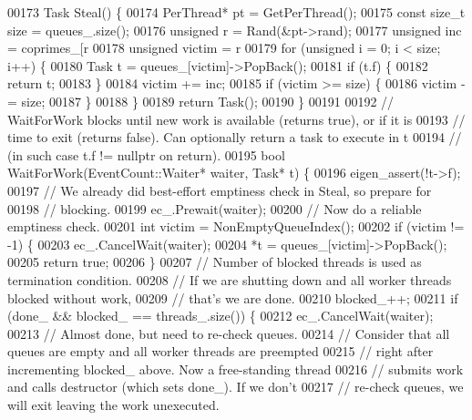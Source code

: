 \begin{DoxyCode}
{00173   Task Steal() \{
00174     PerThread* pt = GetPerThread();
00175     \textcolor{keyword}{const} \textcolor{keywordtype}{size\_t} size = queues\_.size();
00176     \textcolor{keywordtype}{unsigned} r = Rand(&pt->rand);
00177     \textcolor{keywordtype}{unsigned} inc = coprimes\_[r %
00178     \textcolor{keywordtype}{unsigned} victim = r %
00179     \textcolor{keywordflow}{for} (\textcolor{keywordtype}{unsigned} i = 0; i < size; i++) \{
00180       Task t = queues\_[victim]->PopBack();
00181       \textcolor{keywordflow}{if} (t.f) \{
00182         \textcolor{keywordflow}{return} t;
00183       \}
00184       victim += inc;
00185       \textcolor{keywordflow}{if} (victim >= size) \{
00186         victim -= size;
00187       \}
00188     \}
00189     \textcolor{keywordflow}{return} Task();
00190   \}
00191 
00192   \textcolor{comment}{// WaitForWork blocks until new work is available (returns true), or if it is}
00193   \textcolor{comment}{// time to exit (returns false). Can optionally return a task to execute in t}
00194   \textcolor{comment}{// (in such case t.f != nullptr on return).}
00195   \textcolor{keywordtype}{bool} WaitForWork(EventCount::Waiter* waiter, Task* t) \{
00196     eigen\_assert(!t->f);
00197     \textcolor{comment}{// We already did best-effort emptiness check in Steal, so prepare for}
00198     \textcolor{comment}{// blocking.}
00199     ec\_.Prewait(waiter);
00200     \textcolor{comment}{// Now do a reliable emptiness check.}
00201     \textcolor{keywordtype}{int} victim = NonEmptyQueueIndex();
00202     \textcolor{keywordflow}{if} (victim != -1) \{
00203       ec\_.CancelWait(waiter);
00204       *t = queues\_[victim]->PopBack();
00205       \textcolor{keywordflow}{return} \textcolor{keyword}{true};
00206     \}
00207     \textcolor{comment}{// Number of blocked threads is used as termination condition.}
00208     \textcolor{comment}{// If we are shutting down and all worker threads blocked without work,}
00209     \textcolor{comment}{// that's we are done.}
00210     blocked\_++;
00211     \textcolor{keywordflow}{if} (done\_ && blocked\_ == threads\_.size()) \{
00212       ec\_.CancelWait(waiter);
00213       \textcolor{comment}{// Almost done, but need to re-check queues.}
00214       \textcolor{comment}{// Consider that all queues are empty and all worker threads are preempted}
00215       \textcolor{comment}{// right after incrementing blocked\_ above. Now a free-standing thread}
00216       \textcolor{comment}{// submits work and calls destructor (which sets done\_). If we don't}
00217       \textcolor{comment}{// re-check queues, we will exit leaving the work unexecuted.}
}
\end{DoxyCode}
